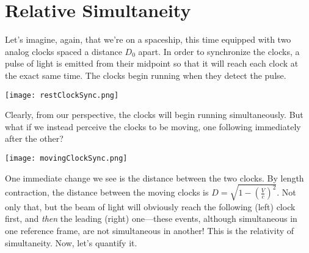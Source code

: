 \documentclass[../p023main.tex]{subfiles}
\begin{document}
\section{Relative Simultaneity}
Let's imagine, again, that we're on a spaceship, this time equipped with two analog clocks spaced a distance $D_0$ apart.
In order to synchronize the clocks, a pulse of light is emitted from their midpoint so that it will reach each clock at the exact same time.
The clocks begin running when they detect the pulse.
\begin{center}
    \texttt{[image: restClockSync.png]}
\end{center}
Clearly, from our perspective, the clocks will begin running simultaneously.
But what if we instead perceive the clocks to be moving, one following immediately after the other?
\begin{center}
    \texttt{[image: movingClockSync.png]}
\end{center}
One immediate change we see is the distance between the two clocks.
By length contraction, the distance between the moving clocks is $D = \sqrt{1 - \left( \frac{V}{c} \right)^2}$.
Not only that, but the beam of light will obviously reach the following (left) clock first, and \textit{then} the leading (right) one---these events, although simultaneous in one reference frame, are not simultaneous in another!
This is the relativity of simultaneity.
Now, let's quantify it.
\end{document}

